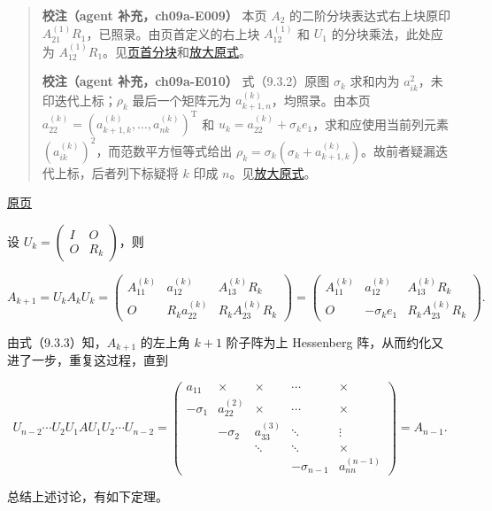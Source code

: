 \documentclass[
  10pt,
  fontset=fandol]{ctexart}
\begin{document}
\begin{quote}
\textbf{校注（agent 补充，ch09a-E009）} 本页 \(A_2\) 的二阶分块表达式右上块原印 \(A_{21}^{(1)}R_1\)，已照录。由页首定义的右上块 \(A_{12}^{(1)}\) 和 \(U_1\) 的分块乘法，此处应为 \(A_{12}^{(1)}R_1\)。见\href{../assets/ch09a/review-p246-initial-partition.png}{页首分块}和\href{../assets/ch09a/review-p246-A-2.png}{放大原式}。

\textbf{校注（agent 补充，ch09a-E010）} 式（9.3.2）原图 \(\sigma_k\) 求和内为 \(a_{ik}^2\)，未印迭代上标；\(\rho_k\) 最后一个矩阵元为 \(a_{k+1,n}^{(k)}\)，均照录。由本页 \(a_{22}^{(k)}=(a_{k+1,k}^{(k)},\ldots,a_{nk}^{(k)})^{\mathrm T}\) 和 \(u_k=a_{22}^{(k)}+\sigma_ke_1\)，求和应使用当前列元素 \((a_{ik}^{(k)})^2\)，而范数平方恒等式给出 \(\rho_k=\sigma_k(\sigma_k+a_{k+1,k}^{(k)})\)。故前者疑漏迭代上标，后者列下标疑将 \(k\) 印成 \(n\)。见\href{../assets/ch09a/review-p246-9-3-2.png}{放大原式}。
\end{quote}

\href{../../source-images/pdf-247.jpeg}{原页}

设 \(U_k=\begin{pmatrix}I&O\\O&R_k\end{pmatrix}\)，则

\[
A_{k+1}=U_kA_kU_k=
\begin{pmatrix}
A_{11}^{(k)}&a_{12}^{(k)}&A_{13}^{(k)}R_k\\
O&R_ka_{22}^{(k)}&R_kA_{23}^{(k)}R_k
\end{pmatrix}
=
\begin{pmatrix}
A_{11}^{(k)}&a_{12}^{(k)}&A_{13}^{(k)}R_k\\
O&-\sigma_ke_1&R_kA_{23}^{(k)}R_k
\end{pmatrix}.
\tag{9.3.3}
\]

由式（9.3.3）知，\(A_{k+1}\) 的左上角 \(k+1\) 阶子阵为上 Hessenberg 阵，从而约化又进了一步，重复这过程，直到

\[
U_{n-2}\cdots U_2U_1AU_1U_2\cdots U_{n-2}
=\begin{pmatrix}
a_{11}&\times&\times&\cdots&\times\\
-\sigma_1&a_{22}^{(2)}&\times&\cdots&\times\\
&-\sigma_2&a_{33}^{(3)}&\ddots&\vdots\\
&&\ddots&\ddots&\times\\
&&&-\sigma_{n-1}&a_{nn}^{(n-1)}
\end{pmatrix}=A_{n-1}.
\]

总结上述讨论，有如下定理。
\end{document}
